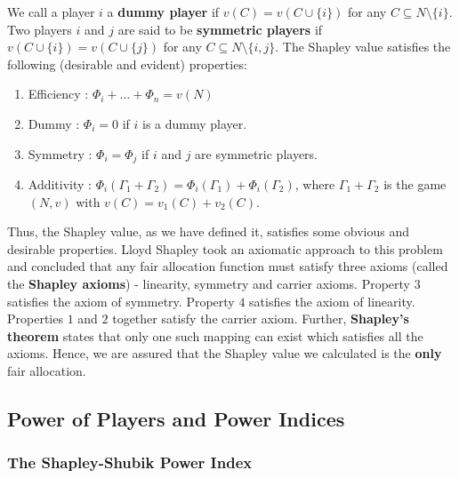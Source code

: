 \documentclass{article}
\theoremstyle{definition}
\begin{document}
We call a player $i$ a \textbf{dummy player} if $v(C) = v\left( C \cup \{i\} \right)$ for any $C \subseteq N \setminus \{i\}$. Two players $i$ and $j$ are said to be \textbf{symmetric players} if $v\left( C \cup \{i\} \right) = v\left( C \cup \{j\} \right)$ for any $C \subseteq N \setminus \{i,j\}$. The Shapley value satisfies the following (desirable and evident) properties:
\begin{enumerate}
    \item Efficiency : $\Phi_i + \ldots + \Phi_n = v(N)$
    \item Dummy : $\Phi_i = 0$ if $i$ is a dummy player.
    \item Symmetry : $\Phi_i = \Phi_j$ if $i$ and $j$ are symmetric players.
    \item Additivity : $\Phi_i\left( \Gamma_1 + \Gamma_2 \right) = \Phi_i \left(\Gamma_1\right) + \Phi_i\left(\Gamma_2\right)$, where $\Gamma_1 + \Gamma_2$ is the game $(N,v)$ with $v(C) = v_1(C) + v_2(C)$.
\end{enumerate}

Thus, the Shapley value, as we have defined it, satisfies some obvious and desirable properties. Lloyd Shapley took an axiomatic approach to this problem and concluded that any fair allocation function must satisfy three axioms (called the \textbf{Shapley axioms}) - linearity, symmetry and carrier axioms. Property $3$ satisfies the axiom of symmetry. Property $4$ satisfies the axiom of linearity. Properties $1$ and $2$ together satisfy the carrier axiom. Further, \textbf{Shapley's theorem} states that only one such mapping can exist which satisfies all the axioms. Hence, we are assured that the Shapley value we calculated is the \textbf{only} fair allocation.

\subsection{Power of Players and Power Indices}

\subsubsection{The Shapley-Shubik Power Index}
\end{document}

